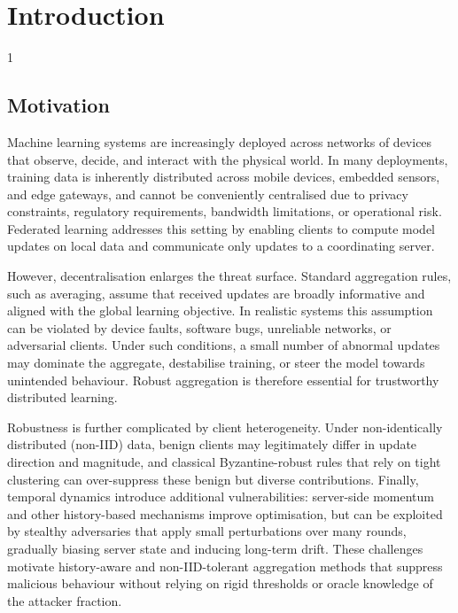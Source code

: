 \doublespacing %

\chapter{Introduction}
\label{ch1}

\begin{spacing}{1}
\minitoc
\end{spacing}
\thesisspacing

\section{Motivation}
Machine learning systems are increasingly deployed across networks of devices that observe, decide, and interact with the physical world. In many deployments, training data is inherently distributed across mobile devices, embedded sensors, and edge gateways, and cannot be conveniently centralised due to privacy constraints, regulatory requirements, bandwidth limitations, or operational risk. Federated learning addresses this setting by enabling clients to compute model updates on local data and communicate only updates to a coordinating server.

However, decentralisation enlarges the threat surface. Standard aggregation rules, such as averaging, assume that received updates are broadly informative and aligned with the global learning objective. In realistic systems this assumption can be violated by device faults, software bugs, unreliable networks, or adversarial clients. Under such conditions, a small number of abnormal updates may dominate the aggregate, destabilise training, or steer the model towards unintended behaviour. Robust aggregation is therefore essential for trustworthy distributed learning.

Robustness is further complicated by client heterogeneity. Under non-identically distributed (non-IID) data, benign clients may legitimately differ in update direction and magnitude, and classical Byzantine-robust rules that rely on tight clustering can over-suppress these benign but diverse contributions. Finally, temporal dynamics introduce additional vulnerabilities: server-side momentum and other history-based mechanisms improve optimisation, but can be exploited by stealthy adversaries that apply small perturbations over many rounds, gradually biasing server state and inducing long-term drift. These challenges motivate history-aware and non-IID-tolerant aggregation methods that suppress malicious behaviour without relying on rigid thresholds or oracle knowledge of the attacker fraction.

